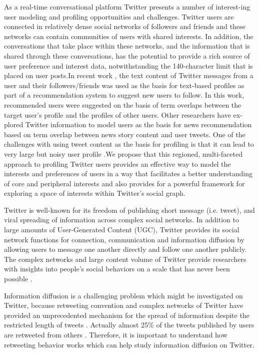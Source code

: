 \documentclass[twocolumn]{svjour3}          %
\begin{document}
As a real-time conversational platform Twitter presents a number of interest-ing user modeling and profiling opportunities and challenges. Twitter users are connected in relatively dense social networks of followers and friends and these networks can contain communities of users with shared interests. In addition, the conversations that take place within these networks, and the information
that is shared through these conversations, has the potential to provide a rich source of user preference and interest data, notwithstanding the 140-character limit that is placed on user posts.In recent work \cite{hannon2010recommending}, the text content of Twitter messages from a user and their followers/friends was used as the basis for text-based profiles as part of a recommendation system to suggest new users to follow. In this work, recommended users were suggested on the basis of term overlaps between the target user’s profile and the profiles of other users. Other researchers have ex- plored Twitter information to model users as the basis for news recommendation \cite{Abel:2011AUM,phelan2011terms} based on term overlap between news story content and user tweets.
One of the challenges with using tweet content as the basis for profiling is that it can lead to very large but noisy user profile \cite{liao2012mining}.We propose that this regioned, multi-faceted approach to profiling Twitter users provides an effective way to model the interests and preferences of users in a way that facilitates a better understanding of core and peripheral interests and also provides for a powerful framework for exploring a space of interests within Twitter’s social graph.

Twitter is well-known for its freedom of publishing short message (i.e. tweet), and viral spreading of information across complex social networks.
In addition to large amounts of User-Generated Content (UGC), Twitter provides its social network functions for connection, communication and information diffusion by allowing users to message one another directly and follow one another publicly. 
The complex networks and large content volume of Twitter provide researchers with insights into people’s social behaviors on a scale that has never been possible \cite{DBLP:conf/hicss/StieglitzD12}.

Information diffusion is a challenging problem which might be investigated on Twitter, because retweeting convention and complex networks of Twitter have provided an unprecedented mechanism for the spread of information despite the restricted length of tweets \cite{Jenders:2013APV}. 
Actually almost 25\% of the tweets published by users are retweeted from others \cite{conf/cikm/YangGCTLZS10}. 
Therefore, it is important to understand how retweeting behavior works which can help study information diffusion on Twitter. 
\end{document}
